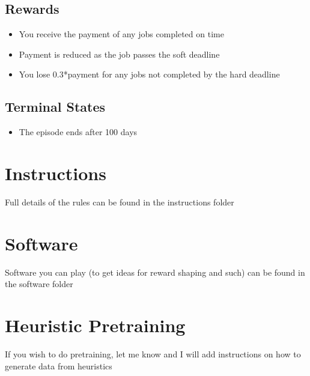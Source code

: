 \documentclass[11pt]{article}
\begin{document}
\subsection{Rewards}
\label{sec:org63b4d76}
\begin{itemize}
\item You receive the payment of any jobs completed on time
\item Payment is reduced as the job passes the soft deadline
\item You lose 0.3*payment for any jobs not completed by the hard deadline
\end{itemize}
\subsection{Terminal States}
\label{sec:org6557c42}
\begin{itemize}
\item The episode ends after 100 days
\end{itemize}
\section{Instructions}
\label{sec:org775029e}
Full details of the rules can be found in the instructions folder
\section{Software}
\label{sec:org600a8b0}
Software you can play (to get ideas for reward shaping and such) can be found in the software folder
\section{Heuristic Pretraining}
\label{sec:orgbebe71c}
If you wish to do pretraining, let me know and I will add instructions on how to generate data from heuristics
\end{document}
